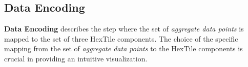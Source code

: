 
\subsection{Data Encoding}
\textbf{Data Encoding} describes the step where the set of \textit{aggregate data points} is mapped to the set of three HexTile components.
The choice of the specific mapping from the set of \textit{aggregate data points} to the HexTile components is crucial in providing an intuitive visualization.
%

